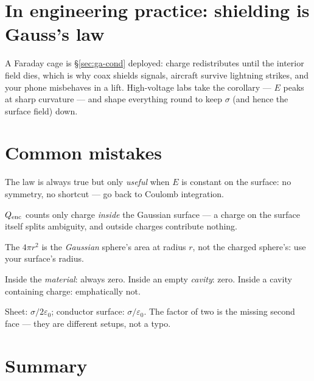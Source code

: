 \section{In engineering practice: shielding is Gauss's law}\label{sec:ga-eng}

A Faraday cage is \S\ref{sec:ga-cond} deployed: charge redistributes
until the interior field dies, which is why coax shields signals,
aircraft survive lightning strikes, and your phone misbehaves in a lift.
High-voltage labs take the corollary --- $E$ peaks at sharp curvature ---
and shape everything round to keep $\sigma$ (and hence the surface
field) down.

\section{Common mistakes}\label{sec:ga-mistakes}

\begin{tripwire}
The law is always true but only \emph{useful} when $E$ is constant on
the surface: no symmetry, no shortcut --- go back to Coulomb
integration.
\end{tripwire}
\begin{tripwire}
$Q_{\rm enc}$ counts only charge \emph{inside} the Gaussian surface ---
a charge on the surface itself splits ambiguity, and outside charges
contribute nothing.
\end{tripwire}
\begin{tripwire}
The $4\pi r^{2}$ is the \emph{Gaussian} sphere's area at radius $r$,
not the charged sphere's: use your surface's radius.
\end{tripwire}
\begin{tripwire}[$E=0$ inside conductor vs cavity]
Inside the \emph{material}: always zero. Inside an empty \emph{cavity}:
zero. Inside a cavity containing charge: emphatically not.
\end{tripwire}
\begin{tripwire}
Sheet: $\sigma/2\varepsilon_0$; conductor surface:
$\sigma/\varepsilon_0$. The factor of two is the missing second face ---
they are different setups, not a typo.
\end{tripwire}

\section{Summary}\label{sec:ga-summary}

